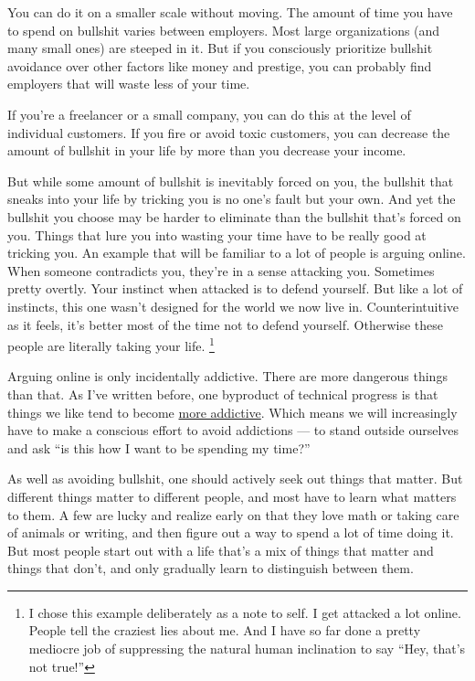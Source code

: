 \documentclass[12pt]{book}
\begin{document}
You can do it on a smaller scale without moving. The amount of time you
have to spend on bullshit varies between employers. Most large
organizations (and many small ones) are steeped in it. But if you
consciously prioritize bullshit avoidance over other factors like money
and prestige, you can probably find employers that will waste less of
your time.

If you're a freelancer or a small company, you can do this at the level
of individual customers. If you fire or avoid toxic customers, you can
decrease the amount of bullshit in your life by more than you decrease
your income.

But while some amount of bullshit is inevitably forced on you, the
bullshit that sneaks into your life by tricking you is no one's fault
but your own. And yet the bullshit you choose may be harder to eliminate
than the bullshit that's forced on you. Things that lure you into
wasting your time have to be really good at tricking you. An example
that will be familiar to a lot of people is arguing online. When someone
contradicts you, they're in a sense attacking you. Sometimes pretty
overtly. Your instinct when attacked is to defend yourself. But like a
lot of instincts, this one wasn't designed for the world we now live in.
Counterintuitive as it feels, it's better most of the time not to defend
yourself. Otherwise these people are literally taking your life.
\footnote{I chose this example deliberately as a note to self. I get
attacked a lot online. People tell the craziest lies about me. And I
have so far done a pretty mediocre job of suppressing the natural human
inclination to say ``Hey, that's not true!''}

Arguing online is only incidentally addictive. There are more dangerous
things than that. As I've written before, one byproduct of technical
progress is that things we like tend to become
\href{addiction.html}{more addictive}. Which means we will increasingly
have to make a conscious effort to avoid addictions --- to stand outside
ourselves and ask ``is this how I want to be spending my time?''

As well as avoiding bullshit, one should actively seek out things that
matter. But different things matter to different people, and most have
to learn what matters to them. A few are lucky and realize early on that
they love math or taking care of animals or writing, and then figure out
a way to spend a lot of time doing it. But most people start out with a
life that's a mix of things that matter and things that don't, and only
gradually learn to distinguish between them.
\end{document}
